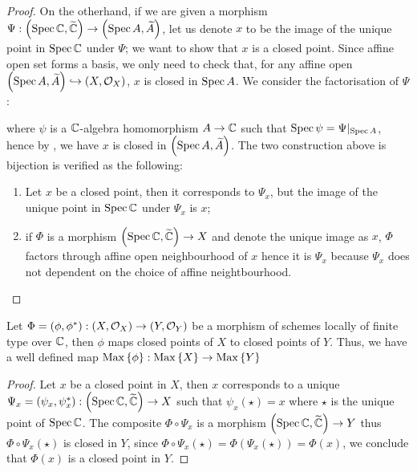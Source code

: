 \begin{proof}
  On the otherhand, if we are given a morphism $\Psi : \left(\operatorname*{Spec}{\mathbb{C}}, \widetilde{\mathbb{C}}\right) \to \left(\operatorname*{Spec}{A}, \widetilde{A}\right)$, let us denote $x$ to be the image of the unique point in $\operatorname{Spec} \mathbb{C}$ under $\Psi$; we want to show that $x$ is a closed point. Since affine open set forms a basis, we only need to check that, for any affine open $\left(\operatorname*{Spec}{A}, \widetilde{A}\right) \hookrightarrow \left(X, \mathcal{O}_{X}\right)$, $x$ is closed in $\operatorname{Spec} A$. We consider the factorisation of $\Psi$:
  \begin{center}
  \end{center}
  where $\psi$ is a $\mathbb{C}$-algebra homomorphism $A \to \mathbb{C}$ such that $\operatorname{Spec}{\psi} = \Psi|_{\operatorname{Spec} A}$, hence by , we have $x$ is closed in $\left(\operatorname*{Spec}{A}, \widetilde{A}\right)$.
  The two construction above is bijection is verified as the following:
  \begin{enumerate}
    \item Let $x$ be a closed point, then it corresponds to $\Psi_{x}$, but the image of the unique point in $\operatorname{Spec} \mathbb{C}$ under $\Psi_{x}$ is $x$;
    \item if $\Phi$ is a morphism $\left(\operatorname*{Spec}{\mathbb{C}}, \widetilde{\mathbb{C}}\right) \to X$ and denote the unique image as $x$,
          $\Phi$ factors through affine open neighbourhood of $x$ hence it is $\Psi_{x}$ because $\Psi_{x}$ does not dependent on the choice of affine neightbourhood.
  \end{enumerate}
\end{proof}

\begin{proposition}
  Let $\Phi = (\phi, \phi^{*}) : \left(X, \mathcal{O}_{X}\right) \to \left(Y, \mathcal{O}_{Y}\right)$ be a morphism of schemes locally of finite type over $\mathbb{C}$, then $\phi$ maps closed points of $X$ to closed points of $Y$. Thus, we have a well defined map $\operatorname{Max}\left\{\phi\right\} : \operatorname{Max}\left\{X\right\} \to \operatorname{Max}\left\{Y\right\}$
  \label{thm:morph-maps-closed-points-to-closed-points}
\end{proposition}

\begin{proof}
  Let $x$ be a closed point in $X$, then $x$ corresponds to a unique $\Psi_{x} = (\psi_{x}, \psi_{x}^{*}) : \left(\operatorname*{Spec}{\mathbb{C}}, \widetilde{\mathbb{C}}\right) \to X$ such that $\psi_{x}(\star) = x$ where $\star$ is the unique point of $\operatorname{Spec}\mathbb{C}$. The composite $\Phi \circ \Psi_{x}$ is a morphism $\left(\operatorname*{Spec}{\mathbb{C}}, \widetilde{\mathbb{C}}\right)\to Y$ thus $\Phi \circ \Psi_{x}(\star)$ is closed in $Y$, since $\Phi \circ \Psi_{x}(\star) = \Phi(\Psi_{x}(\star)) = \Phi(x)$, we conclude that $\Phi(x)$ is a closed point in $Y$.
\end{proof}

